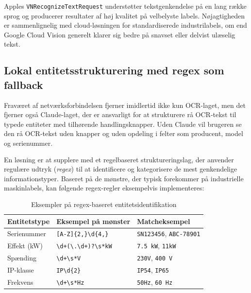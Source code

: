 Apples \texttt{VNRecognizeTextRequest} understøtter tekstgenkendelse på en lang række sprog og producerer resultater af høj kvalitet på velbelyste labels. Nøjagtigheden er sammenlignelig med cloud-løsningen for standardiserede industrilabels, om end Google Cloud Vision generelt klarer sig bedre på snavset eller delvist ulæselig tekst.

\subsection{Lokal entitetsstrukturering med regex som fallback}
\label{subsec:regex-fallback}

Fraværet af netværksforbindelsen fjerner imidlertid ikke kun OCR-laget, men det fjerner også Claude-laget, der er ansvarligt for at strukturere rå OCR-tekst til typede entiteter med tilhørende handlingsknapper. Uden Claude vil brugeren se den rå OCR-tekst uden knapper og uden opdeling i felter som producent, model og serienummer.

En løsning er at supplere med et regelbaseret struktureringslag, der anvender regulære udtryk (\textit{regex}) til at identificere og kategorisere de mest genkendelige informationstyper. Baseret på de mønstre, der typisk forekommer på industrielle maskinlabels, kan følgende regex-regler eksempelvis implementeres:

\begin{table}[H]
  \centering
  \caption{Eksempler på regex-baseret entitetsidentifikation}
  \label{tab:regex}
  \begin{tabularx}{\textwidth}{@{}llX@{}}
    \toprule
    \textbf{Entitetstype} & \textbf{Eksempel på mønster} & \textbf{Matcheksempel} \\
    \midrule
    Serienummer   & \texttt{[A-Z]\{2,\}\textbackslash d\{4,\}} & \texttt{SN123456}, \texttt{ABC-78901} \\
    \addlinespace
    Effekt (kW)   & \texttt{\textbackslash d+(\textbackslash.\textbackslash d+)?\textbackslash s*kW} & \texttt{7.5 kW}, \texttt{11kW} \\
    \addlinespace
    Spænding      & \texttt{\textbackslash d+\textbackslash s*V} & \texttt{230V}, \texttt{400 V} \\
    \addlinespace
    IP-klasse     & \texttt{IP\textbackslash d\{2\}} & \texttt{IP54}, \texttt{IP65} \\
    \addlinespace
    Frekvens      & \texttt{\textbackslash d+\textbackslash s*Hz} & \texttt{50Hz}, \texttt{60 Hz} \\
    \bottomrule
  \end{tabularx}
\end{table}

